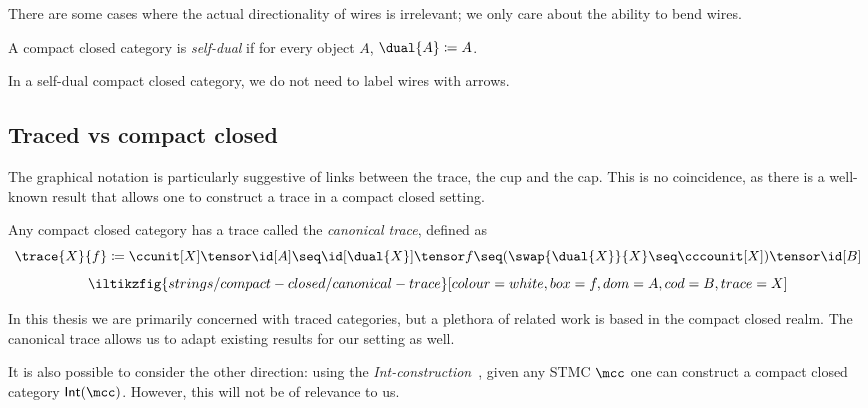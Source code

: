 

There are some cases where the actual directionality of wires is irrelevant;
we only care about the ability to bend wires.

\begin{definition}
    A compact closed category is \emph{self-dual} if for every object \(A\),
    \(\dual{A} \coloneqq A\).
\end{definition}

In a self-dual compact closed category, we do not need to label wires with
arrows.

\subsection{Traced vs compact closed}

The graphical notation is particularly suggestive of links between the
trace, the cup and the cap.
This is no coincidence, as there is a well-known result that allows one to
construct a trace in a compact closed setting.

\begin{proposition}
    \label{prop:canonical-trace}
    Any compact closed category has a trace called the \emph{canonical trace},
    defined as \[
        \trace{X}{f}
        \coloneqq
        \ccunit[X] \tensor \id[A]
        \seq
        \id[\dual{X}] \tensor f
        \seq
        (\swap{\dual{X}}{X} \seq \cccounit[X]) \tensor \id[B]
    \]
    \[
        \iltikzfig{strings/compact-closed/canonical-trace}[colour=white,box=f,dom=A,cod=B,trace=X]
    \]
\end{proposition}

In this thesis we are primarily concerned with traced categories, but a plethora
of related work is based in the compact closed realm.
The canonical trace allows us to adapt existing results for our setting as well.

\begin{remark}
    It is also possible to consider the other direction: using the
    \emph{Int-construction}~\cite{joyal1996traced}, given any STMC
    \(\mcc\) one can construct a compact closed category \(\mathsf{Int}(\mcc)\).
    However, this will not be of relevance to us.
\end{remark}